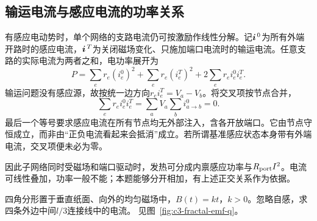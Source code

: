 \subsection{输运电流与感应电流的功率关系}\label{sec:c3-power}
有感应电动势时，单个网络的支路电流仍可按激励作线性分解。记$\bm{i}^{\,0}$为所有外端开路时的感应电流，$\bm{i}^{\,T}$为关闭磁场变化、只施加端口电流时的输运电流。任意支路的实际电流为两者之和，电功率展开为
\[
 P=\sum_e r_e(i_e^0)^2+\sum_e r_e(i_e^T)^2
 +2\sum_e r_e i_e^0i_e^T.
\]
输运问题没有感应源，故按统一边方向$r_ei_e^T=V_a-V_b$。将交叉项按节点合并，
\[
 \sum_e r_ei_e^0i_e^T
 =\sum_aV_a\sum_bi^0_{a\to b}=0.
\]
最后一个等号要求感应电流在所有节点均无外部注入，含各开放端口。它由节点守恒成立，而非由“正负电流看起来会抵消”成立。若所谓基准感应状态本身带有外端电流，交叉项便未必为零。

因此子网络同时受磁场和端口驱动时，发热可分成内禀感应功率与$R_{\rm port}I^2$。电流可线性叠加，功率一般不能；本题能够分开相加，有上述正交关系作为依据。

\begin{example}[中间连接线的感应电流]\label{ex:c3-fractal-emf}
四角分形置于垂直纸面、向外的均匀磁场中，$B(t)=kt$，$k>0$。忽略自感，求四条外边中间$l/3$连接线中的电流。 见图~\ref{fig:c3-fractal-emf-q}。
\end{example}

